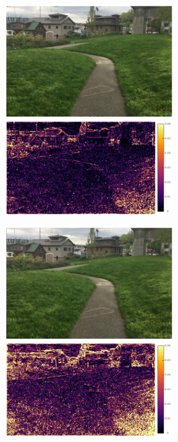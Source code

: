 \documentclass{article}
\begin{document}
\begin{figure}[h]
\begin{subfigure}{0.14\textwidth}
    \includegraphics[width=1\linewidth]{qua_imgs/720p_240fps_1_bmbc.jpg}
\end{subfigure}%
\begin{subfigure}{0.14\textwidth}
	\centering
    \includegraphics[width=1\linewidth]{qua_imgs/720p_240fps_1_rrin.jpg}

\end{subfigure}
\end{figure}
\end{document}
